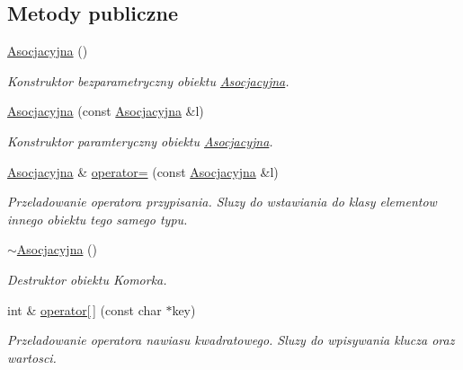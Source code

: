 \subsection*{Metody publiczne}
\begin{DoxyCompactItemize}
\item 
\hyperlink{class_asocjacyjna_a1c65a8bcfb084dcdfa205b052fefd141}{Asocjacyjna} ()
\begin{DoxyCompactList}\small\item\em Konstruktor bezparametryczny obiektu \hyperlink{class_asocjacyjna}{Asocjacyjna}. \end{DoxyCompactList}\item 
\hyperlink{class_asocjacyjna_a4dfb11269865e38b988dbacf1cc44409}{Asocjacyjna} (const \hyperlink{class_asocjacyjna}{Asocjacyjna} \&l)
\begin{DoxyCompactList}\small\item\em Konstruktor paramteryczny obiektu \hyperlink{class_asocjacyjna}{Asocjacyjna}. \end{DoxyCompactList}\item 
\hyperlink{class_asocjacyjna}{Asocjacyjna} \& \hyperlink{class_asocjacyjna_add65b5482b856404b130b69b71a5cb9b}{operator=} (const \hyperlink{class_asocjacyjna}{Asocjacyjna} \&l)
\begin{DoxyCompactList}\small\item\em Przeladowanie operatora przypisania. Sluzy do wstawiania do klasy elementow innego obiektu tego samego typu. \end{DoxyCompactList}\item 
\hyperlink{class_asocjacyjna_aa33745fa9b42796199d58f29fa0cd8f0}{$\sim$\-Asocjacyjna} ()
\begin{DoxyCompactList}\small\item\em Destruktor obiektu Komorka. \end{DoxyCompactList}\item 
int \& \hyperlink{class_asocjacyjna_a517bf91bf5550a58669c61ec4e209a8a}{operator\mbox{[}$\,$\mbox{]}} (const char $\ast$key)
\begin{DoxyCompactList}\small\item\em Przeladowanie operatora nawiasu kwadratowego. Sluzy do wpisywania klucza oraz wartosci. \end{DoxyCompactList}\end{DoxyCompactItemize}
